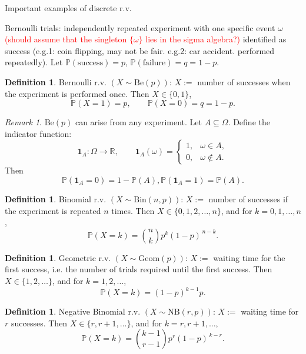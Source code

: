 \documentclass[11pt]{article}
\theoremstyle{plain}
\theoremstyle{definition}
\newtheorem{definition}[theorem]{Definition}
\theoremstyle{remark}
\newtheorem{remark}[theorem]{Remark}
\begin{document}
	Important examples of discrete r.v.
	
	Bernoulli trials: independently repeated experiment with one specific event $\omega$ \textcolor{red}{(should assume that the singleton $\{\omega\}$ lies in the sigma algebra?)} identified as success
	(e.g.1: coin flipping, may not be fair. e.g.2: car accident. performed repeatedly).
	Let \(\mathbb{P}(\text{success})=p\), \(\mathbb{P}(\text{failure})=q=1-p\).
	
	\begin{definition}
		Bernoulli r.v. \((X\sim \mathrm{Be}(p))\): \(X:=\) number of successes when the experiment is performed once.
		Then \(X\in\{0,1\}\),
		\[
		\mathbb{P}(X=1)=p,\qquad \mathbb{P}(X=0)=q=1-p.
		\]
	\end{definition}
	
	\begin{remark}
		\(\mathrm{Be}(p)\) can arise from any experiment.
		Let \(A\subseteq \Omega\). Define the indicator function:
		\[
		\mathbf{1}_A:\Omega\to \mathbb{R},\qquad
		\mathbf{1}_A(\omega)=
		\begin{cases}
			1, & \omega\in A,\\
			0, & \omega\notin A.
		\end{cases}
		\]
		Then
		\[
		\mathbb{P}(\mathbf{1}_A=0)=1-\mathbb{P}(A),
		\mathbb{P}(\mathbf{1}_A=1)=\mathbb{P}(A).
		\]
	\end{remark}
	
	\begin{definition}
		Binomial r.v. \((X\sim \mathrm{Bin}(n,p))\):
		\(X:=\) number of successes if the experiment is repeated \(n\) times.
		Then \(X\in\{0,1,2,\dots,n\}\), and for \(k=0,1,\dots,n\),
		\[
		\mathbb{P}(X=k)=\binom{n}{k}p^k(1-p)^{\,n-k}.
		\]
	\end{definition}
	
	\begin{definition}
		Geometric r.v. \((X\sim \mathrm{Geom}(p))\):
		\(X:=\) waiting time for the first success, i.e. the number of trials required until the first success.
		Then \(X\in\{1,2,\dots\}\), and for \(k=1,2,\dots\),
		\[
		\mathbb{P}(X=k)=(1-p)^{k-1}p.
		\]
	\end{definition}
	
	\begin{definition}
		Negative Binomial r.v. \((X\sim \mathrm{NB}(r,p))\):
		\(X:=\) waiting time for \(r\) successes.
		Then \(X\in\{r,r+1,\dots\}\), and for \(k=r,r+1,\dots\),
		\[
		\mathbb{P}(X=k)=\binom{k-1}{r-1}p^r(1-p)^{\,k-r}.
		\]
	\end{definition}
	
\end{document}
